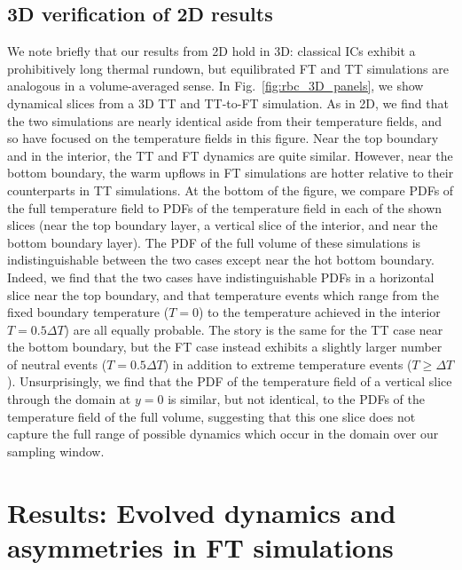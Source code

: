 \documentclass[aps, pre, onecolumn, nofootinbib, notitlepage, groupedaddress, amsfonts, amssymb, amsmath, longbibliography, superscriptaddress]{revtex4-1}
\newcommand{\ea}[1]{{\color{red} #1}}
\begin{document}
\ea{
\subsection{3D verification of 2D results}
We note briefly that our results from 2D hold in 3D: classical ICs exhibit a prohibitively long thermal rundown, but equilibrated FT and TT simulations are analogous in a volume-averaged sense.
In Fig.~\ref{fig:rbc_3D_panels}, we show dynamical slices from a 3D TT and TT-to-FT simulation.
As in 2D, we find that the two simulations are nearly identical aside from their temperature fields, and so have focused on the temperature fields in this figure.
Near the top boundary and in the interior, the TT and FT dynamics are quite similar.
However, near the bottom boundary, the warm upflows in FT simulations are hotter relative to their counterparts in TT simulations.
At the bottom of the figure, we compare PDFs of the full temperature field to PDFs of the temperature field in each of the shown slices (near the top boundary layer, a vertical slice of the interior, and near the bottom boundary layer).
The PDF of the full volume of these simulations is indistinguishable between the two cases except near the hot bottom boundary.
Indeed, we find that the two cases have indistinguishable PDFs in a horizontal slice near the top boundary, and that temperature events which range from the fixed boundary temperature ($T = 0$) to the temperature achieved in the interior $T = 0.5\Delta T$) are all equally probable.
The story is the same for the TT case near the bottom boundary, but the FT case instead exhibits a slightly larger number of neutral events ($T = 0.5\Delta T$) in addition to extreme temperature events ($T \geq \Delta T$).
Unsurprisingly, we find that the PDF of the temperature field of a vertical slice through the domain at $y = 0$ is similar, but not identical, to the PDFs of the temperature field of the full volume, suggesting that this one slice does not capture the full range of possible dynamics which occur in the domain over our sampling window.
}

\FloatBarrier



\section{Results: Evolved dynamics and asymmetries in FT simulations}
\label{sec:results_dynamics}
\end{document}

